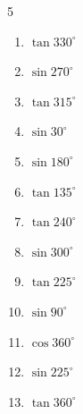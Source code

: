 \begin{multicols}{5}
\begin{enumerate}
        \phantom{$\displaystyle =-1$}

  \item $\displaystyle \tan{330^\circ}$


  \item $\displaystyle \sin{270^\circ}$

        \phantom{$\displaystyle =-1$}

  \item $\displaystyle \tan{315^\circ}$

        \phantom{$\displaystyle =-1$}

  \item $\displaystyle \sin{30^\circ}$


  \item $\displaystyle \sin{180^\circ}$

        \phantom{$\displaystyle =0$}

  \item $\displaystyle \tan{135^\circ}$

        \phantom{$\displaystyle =-1$}

  \item $\displaystyle \tan{240^\circ}$


  \item $\displaystyle \sin{300^\circ}$


  \item $\displaystyle \tan{225^\circ}$

        \phantom{$\displaystyle =1$}

  \item $\displaystyle \sin{90^\circ}$

        \phantom{$\displaystyle =1$}

  \item $\displaystyle \cos{360^\circ}$

        \phantom{$\displaystyle =1$}

  \item $\displaystyle \sin{225^\circ}$


  \item $\displaystyle \tan{360^\circ}$


\end{enumerate}
\end{multicols}
